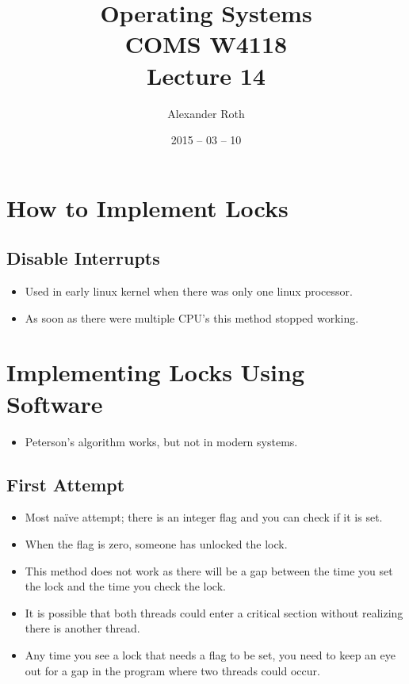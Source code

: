 \documentclass[]{article}
\begin{document}
\newcommand{\code}{\texttt}
\newtheorem{thm}{Theorem}
\title{Operating Systems \\ COMS W4118 \\ Lecture 14}
\author{Alexander Roth}
\date{2015 -- 03 -- 10}
\maketitle

\section{How to Implement Locks}
\subsection{Disable Interrupts}
\begin{itemize}
\item Used in early linux kernel when there was only one linux processor.
\item As soon as there were multiple CPU's this method stopped working.
\end{itemize}

\section{Implementing Locks Using Software}
\begin{itemize}
\item Peterson's algorithm works, but not in modern systems.
\end{itemize}

\subsection{First Attempt}
\begin{itemize}
\item Most na\"ive attempt; there is an integer flag and you can check if it is
set.
\item When the flag is zero, someone has unlocked the lock.
\item This method does not work as there will be a gap between the time you set
the lock and the time you check the lock.
\item It is possible that both threads could enter a critical section without
realizing there is another thread.
\item Any time you see a lock that needs a flag to be set, you need to keep an
eye out for a gap in the program where two threads could occur.
\end{itemize}
\end{document}
